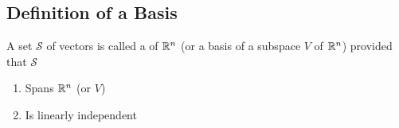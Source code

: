 \documentclass{ximera}
\begin{document}





\subsection*{Definition of a Basis}

\begin{definition}\label{def:basis}
A set $\mathcal{S}$ of vectors is called a  of $\mathbb{R}^n$ (or a basis of a subspace $V$ of $\mathbb{R}^n$) provided that $\mathcal{S}$
\begin{enumerate}
\item \label{item:defbasis1}
Spans $\mathbb{R}^n$ (or $V$)
\item \label{item:defbasis2}
Is linearly independent
\end{enumerate}
\end{definition}
\end{document}
